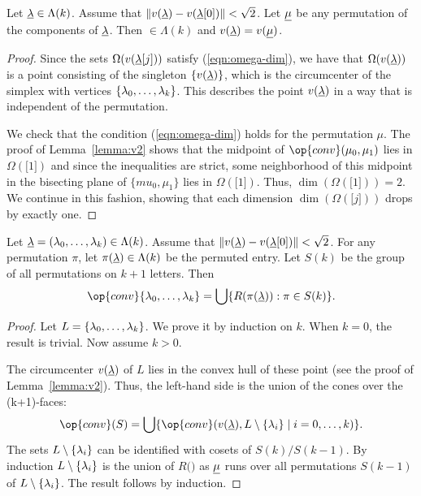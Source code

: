 \begin{lemma}   Let ${\underline{\lambda}}\in\Lambda(k)$.  Assume that ${\|v({\underline{\lambda}})-v({\underline{\lambda}}[0])\|}<\sqrt2$.
Let ${\underline{\mu}}$ be any permutation of the components of ${\underline{\lambda}}$.  Then $\bm\in\Lambda(k)$ and
 $v({\underline{\lambda}}) = v({\underline{\mu}})$.
\end{lemma}

\begin{proof} 
Since the sets $\Omega(v({\underline{\lambda}}[j]))$ satisfy (\ref{eqn:omega-dim}), we have that
$\Omega(v({\underline{\lambda}}))$ is a point consisting of the singleton $\{v({\underline{\lambda}})\}$, which is the
circumcenter of the simplex with vertices $\{\lambda_0,\ldots,\lambda_k\}$.  This describes
the point $v({\underline{\lambda}})$ in a way that is independent of the permutation.

We check that the condition (\ref{eqn:omega-dim}) holds for the permutation $\mu$.
The proof of Lemma~\ref{lemma:v2} shows that the midpoint of $\op{conv}(\mu_0,\mu_1)$
lies in $\Omega(\bm[1])$ and since the inequalities are strict, some neighborhood
of this midpoint in the bisecting plane of $\{mu_0,\mu_1\}$ lies in $\Omega(\bm[1])$.
Thus, $\dim(\Omega(\bm[1]))=2$.  We continue in this fashion, showing that each dimension
$\dim(\Omega(\bm[j]))$ drops by exactly one.
\end{proof}

\begin{lemma}\label{lemma:Rconv} Let ${\underline{\lambda}} = (\lambda_0,\ldots,\lambda_k)\in\Lambda(k)$.  Assume that ${\|v({\underline{\lambda}})-v({\underline{\lambda}}[0])\|}<\sqrt2$.
For any permutation $\pi$, let $\pi({\underline{\lambda}})\in\Lambda(k)$ be the permuted entry.  Let
$S(k)$ be the group of all permutations on $k+1$ letters.   Then
$$
\op{conv}\{\lam_0,\ldots,\lam_k\} = \bigcup \{ R(\pi(\bl)) : \pi\in S(k)\}.
$$
\end{lemma}

\begin{proof} Let $L = \{\lambda_0,\ldots,\lambda_k\}$.  We prove it by induction on $k$.
When $k=0$, the result is trivial.  Now assume $k>0$.

The circumcenter $v({\underline{\lambda}})$ of $L$ lies in the convex hull of these
point (see the proof of Lemma~\ref{lemma:v2}).  Thus, the left-hand side is the union
of the cones over the (k+1)-faces:
$$
\op{conv}(S) = \bigcup\{ \op{conv}(v(\bl),L\setminus \{\lam_i\}\mid i=0,\ldots,k) \}.
$$
The sets $L\setminus \{\lambda_i\}$ can be identified with  cosets of $S(k)/S(k-1)$.
By induction $L\setminus \{\lambda_i\}$ is the union of $R(\bm)$ as ${\underline{\mu}}$ runs
over all permutations $S(k-1)$ of $L\setminus \{\lambda_i\}$.
The result follows by induction.
\end{proof}

